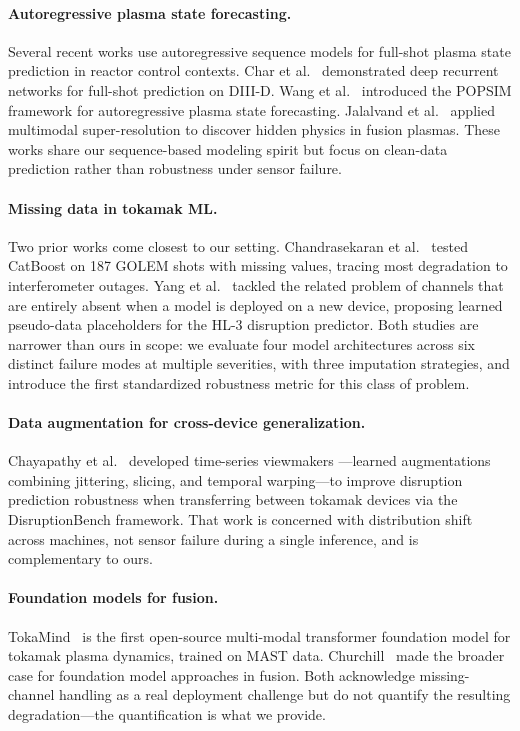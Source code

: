 \documentclass[10pt,twocolumn]{article}
\begin{document}
\paragraph{Autoregressive plasma state forecasting.}
Several recent works use autoregressive sequence models for full-shot
plasma state prediction in reactor control contexts. Char et
al.~\cite{char2024} demonstrated deep recurrent networks for full-shot
prediction on DIII-D. Wang et al.~\cite{wang2025popsim} introduced the
POPSIM framework for autoregressive plasma state forecasting. Jalalvand
et al.~\cite{jalalvand2025} applied multimodal super-resolution to
discover hidden physics in fusion plasmas. These works share our
sequence-based modeling spirit but focus on clean-data prediction rather
than robustness under sensor failure.

\paragraph{Missing data in tokamak ML.}
Two prior works come closest to our setting.
Chandrasekaran et al.~\cite{golem2021} tested CatBoost on 187 GOLEM
shots with missing values, tracing most degradation to interferometer
outages. Yang et al.~\cite{yang2025hl3} tackled the related problem of
channels that are entirely absent when a model is deployed on a new
device, proposing learned pseudo-data placeholders for the HL-3
disruption predictor. Both studies are narrower than ours in scope:
we evaluate four model architectures across six distinct failure
modes at multiple severities, with three imputation strategies, and
introduce the first standardized robustness metric for this class of
problem.

\paragraph{Data augmentation for cross-device generalization.}
Chayapathy et al.~\cite{viewmakers2024} developed time-series viewmakers
—learned augmentations combining jittering, slicing, and temporal
warping—to improve disruption prediction robustness when transferring
between tokamak devices via the DisruptionBench framework. That work
is concerned with distribution shift across machines, not sensor
failure during a single inference, and is complementary to ours.

\paragraph{Foundation models for fusion.}
TokaMind~\cite{boschi2026tokamind} is the first open-source multi-modal
transformer foundation model for tokamak plasma dynamics, trained on
MAST data. Churchill~\cite{churchill2025} made the broader case for
foundation model approaches in fusion. Both acknowledge missing-channel
handling as a real deployment challenge but do not quantify the
resulting degradation—the quantification is what we provide.
\end{document}
